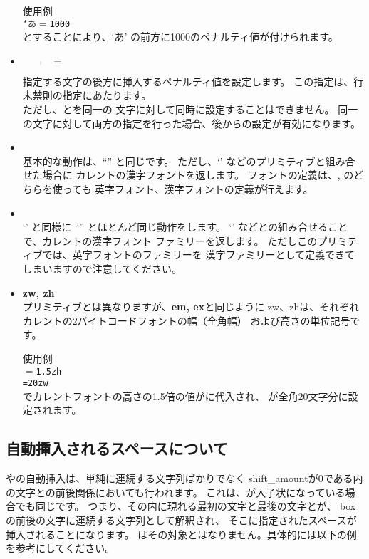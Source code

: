 \begin{itemize}
	\noindent
	使用例\\
	{\tt{}`あ$=$1000}\\
	とすることにより、`あ' の前方に1000のペナルティ値が付けられます。
\item {}
	\begin{quote}
	$=$
	\end{quote}
	指定する文字の後方に挿入するペナルティ値を設定します。
	この指定は、行末禁則の指定にあたります。\\
	ただし、とを同一の
	文字に対して同時に設定することはできません。
	同一の文字に対して両方の指定を行った場合、後からの設定が有効になります。
\item {} \\
	基本的な動作は、``'' と同じです。
	ただし、`' などのプリミティブと組み合せた場合に
	カレントの漢字フォントを返します。
	フォントの定義は、, のどちらを使っても
	英字フォント、漢字フォントの定義が行えます。
\item {} \\
	`' と同様に ``'' とほとんど同じ動作をします。
	`' などとの組み合せることで、カレントの漢字フォント
	ファミリーを返します。
	ただしこのプリミティブでは、英字フォントのファミリーを
	漢字ファミリーとして定義できてしまいますので注意してください。
\item {{\bf zw, zh}} \\
	プリミティブとは異なりますが、{\bf em, ex}と同じように
	zw、zhは、それぞれカレントの2バイトコードフォントの幅（全角幅）
	および高さの単位記号です。

	\noindent
	使用例\\
	{\tt{}$=$1.5zh\\
	=20zw}\\
	でカレントフォントの高さの1.5倍の値がに代入され、
	が全角20文字分に設定されます。
\end{itemize}

\subsection{自動挿入されるスペースについて}
やの自動挿入は、単純に連続する文字列ばかりでなく
shift\_amountが0である内の文字との前後関係においても行われます。
これは、が入子状になっている場合でも同じです。
つまり、その内に現れる最初の文字と最後の文字とが、
boxの前後の文字に連続する文字列として解釈され、
そこに指定されたスペースが挿入されることになります。
はその対象とはなりません。具体的には以下の例を参考にしてください。

